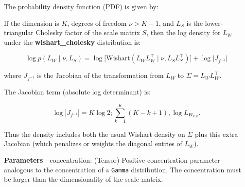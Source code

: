 \documentclass[
  letterpaper,
  DIV=11,
  numbers=noendperiod]{scrartcl}
\begin{document}
The probability density function (PDF) is given by:

If the dimension is \(K\), degrees of freedom \(\nu > K - 1\), and
\(L_S\) is the lower‐triangular Cholesky factor of the scale matrix
\(S\), then the log density for \(L_W\) under the
\textbf{wishart\_cholesky} distribution is:

\[
\log p(L_W \mid \nu, L_S)
= \log \bigl[ \text{Wishart}(L_W L_W^\top \mid \nu, L_S L_S^\top) \bigr] + \log \bigl| J_{f^{-1}} \bigr|
\]

where \(J_{f^{-1}}\) is the Jacobian of the transformation from \(L_W\)
to \(\Sigma = L_W L_W^\top\).

The Jacobian term (absolute log determinant) is:

\[
\log |J_{f^{-1}}| = K \log 2 ; \sum_{k=1}^K (K - k + 1),\log L_{W_{k,k}}.
\]

Thus the density includes both the usual Wishart density on \(\Sigma\)
plus this extra Jacobian (which penalizes or weights the diagonal
entries of \(L_W\)).

\textbf{Parameters} - concentration: (Tensor) Positive concentration
parameter analogous to the concentration of a \texttt{Gamma}
distribution. The concentration must be larger than the dimensionality
of the scale matrix.
\end{document}
